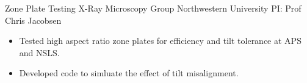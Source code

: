 

        {Zone Plate Testing}
        {\newline X-Ray Microscopy Group}
        {Northwestern University}
        {PI: Prof Chris Jacobsen}{
    \begin{itemize}
		\item Tested high aspect ratio zone plates for efficiency and tilt tolerance at APS and NSLS.
		\item Developed code to simluate the effect of tilt misalignment.
    \end{itemize}
	}

